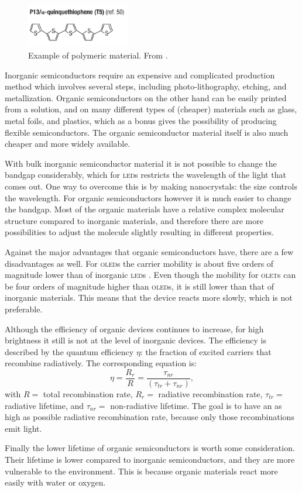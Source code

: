 \begin{figure}[!ht]
 \begin{center}
  \includegraphics[width=0.4\textwidth]{zwavelbenzeen}
  \caption{Example of polymeric material. From \citet{Muccini}.}
  \label{fig:zwavelbenzeen}
 \end{center}
\end{figure}

Inorganic semiconductors require an expensive and complicated production method which involves several steps, including photo-lithography, etching, and metallization. Organic semiconductors on the other hand can be easily printed from a solution, and on many different types of (cheaper) materials such as glass, metal foils, and plastics, which as a bonus gives the possibility of producing flexible semiconductors. The organic semiconductor material itself is also much cheaper and more widely available.

With bulk inorganic semiconductor material it is not possible to change the bandgap considerably, which for \textsc{led}s restricts the wavelength of the light that comes out. One way to overcome this is by making nanocrystals: the size controls the wavelength. For organic semiconductors however it is much easier to change the bandgap. Most of the organic materials have a relative complex molecular structure compared to inorganic materials, and therefore there are more possibilities to adjust the molecule slightly resulting in different properties.

Against the major advantages that organic semiconductors have, there are a few disadvantages as well. For \textsc{oled}s the carrier mobility is about five orders of magnitude lower than of inorganic \textsc{led}s \citep{Muccini}. Even though the mobility for \textsc{olet}s can be four orders of magnitude higher than \textsc{oled}s, it is still lower than that of inorganic materials. This means that the device reacts more slowly, which is not preferable.

Although the efficiency of organic devices continues to increase, for high brightness it still is not at the level of inorganic devices. The efficiency is described by the quantum efficiency $\eta$: the fraction of excited carriers that recombine radiatively. The corresponding equation is:
\[
 \eta = \frac{R_{r}}{R} = \frac{\tau_{nr}}{(\tau_{tr}+\tau_{nr})},
\]
with $R=$ total recombination rate, $R_{r}=$ radiative recombination rate, $\tau_{tr}=$ radiative lifetime, and $\tau_{nr}=$ non-radiative lifetime. The goal is to have an as high as possible radiative recombination rate, because only those recombinations emit light.

Finally the lower lifetime of organic semiconductors is worth some consideration. Their lifetime is lower compared to inorganic semiconductors, and they are more vulnerable to the environment. This is because organic materials react more easily with water or oxygen. 
